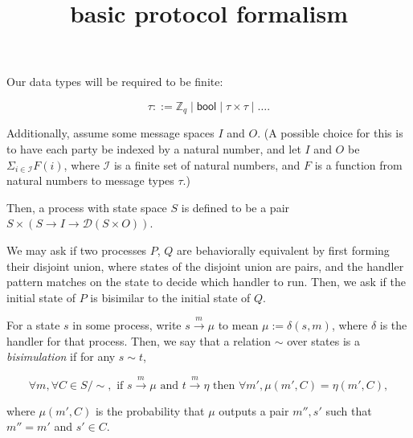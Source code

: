 \documentclass{article}
\title {basic protocol formalism}
\begin{document}
\maketitle

Our data types will be required to be finite:

\[ \tau ::= \mathbb{Z}_{q} \mid \textsf{bool} \mid \tau \times \tau \mid \dots. \]

Additionally, assume some message spaces $I$ and $O$. (A possible choice for this is to have each party be indexed by a natural number, and let $I$ and $O$ be $\Sigma_{i \in \mathcal{I}} F(i)$, where $\mathcal{I}$ is a finite set of natural numbers, and $F$ is a function from natural numbers to message types $\tau$.)

Then, a process with state space $S$ is defined to be a pair $S \times (S \to I \to \mathcal{D}(S \times O))$.

We may ask if two processes $P$, $Q$ are behaviorally equivalent by first forming their disjoint union, where states of the disjoint union are pairs, and the handler pattern matches on the state to decide which handler to run. Then, we ask if the initial state of $P$ is bisimilar to the initial state of $Q$.

For a state $s$ in some process, write $s \xrightarrow{m} \mu$ to mean $\mu := \delta (s,m)$, where $\delta$ is the handler for that process. Then, we say that a relation $\sim$ over states is a \emph{bisimulation} if for any $s \sim t$,

\[ \forall m, \forall C \in S / \sim, \text{ if } s \xrightarrow{m} \mu \text{ and } t \xrightarrow{m} \eta \text{ then }  \forall m', \mu(m',C) = \eta(m',C),\]

where $\mu(m',C)$ is the probability that $\mu$ outputs a pair $m'', s'$ such that $m'' = m'$ and $s' \in C$.
\end{document}
